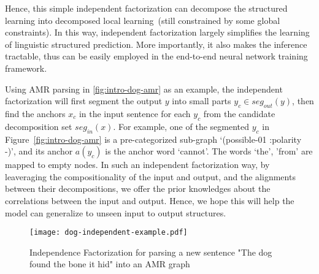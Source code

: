 Hence, this simple independent factorization can decompose the
structured learning into decomposed local learning~(still constrained
by some global constraints). In this way, independent factorization
largely simplifies the learning of linguistic structured
prediction. More importantly, it also makes the inference tractable,
thus can be easily employed in the end-to-end neural network training
framework.

Using AMR parsing in \autoref{fig:intro-dog-amr} as an example, the
independent factorization will first segment the output $y$ into small
parts $y_{c} \in seg_{out}(y)$, then find the anchors $x_{c}$ in the
input sentence for each $y_{c}$ from the candidate decomposition set
$seg_{in}(x)$. For example, one of the segmented $y_{c}$ in
Figure~\ref{fig:intro-dog-amr} is a pre-categorized sub-graph
`(possible-01 :polarity -)', and its anchor $a(y_{c})$ is the anchor
word `cannot'. The words `the', 'from' are mapped to empty nodes.  In
such an independent factorization way, by leaveraging the
compositionality of the input and output, and the alignments between
their decompositions, we offer the prior knowledges about the
correlations between the input and output. Hence, we hope this will
help the model can generalize to unseen input to output structures.

\begin{figure}[!th]
\centering
\texttt{[image: dog-independent-example.pdf]}
\caption{\label{fig:intro-independent-example}Independence
  Factorization for parsing a new sentence "The dog found the bone it
  hid" into an AMR graph}
\end{figure}

